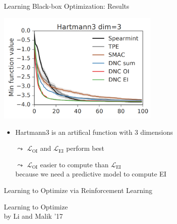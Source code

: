 \begin{frame}[c]{Learning Black-box Optimization: Results\newline {}}

\centering
\includegraphics[width=0.6\textwidth]{images/l2bo_hartmann3}

\begin{itemize}
\item Hartmann3 is an artifical function with 3 dimensions
\pause
\item[$\leadsto$] $\mathcal{L}_{\text{OI}}$ and $\mathcal{L}_{\text{EI}}$ perform best
\item[$\leadsto$] $\mathcal{L}_{\text{OI}}$ easier to compute than $\mathcal{L}_{\text{EI}}$\\ because we need a predictive model to compute EI 
\end{itemize}

\end{frame}
\begin{frame}[c]{Learning to Optimize via Reinforcement Learning\newline {}}

\centering\huge
Learning to Optimize\\
by Li and Malik '17

\end{frame}
